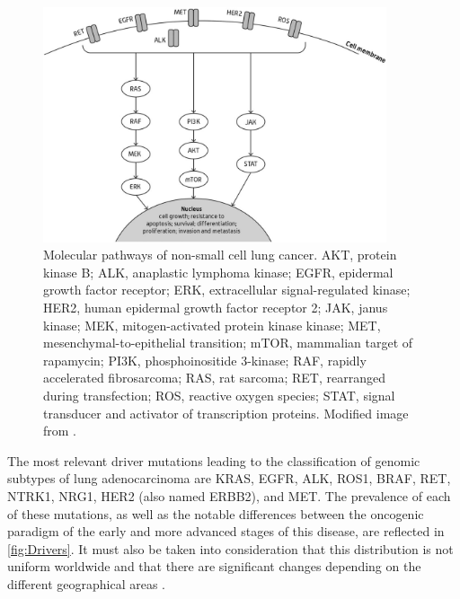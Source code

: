 \begin{figure}[t]
    \centering
    \includegraphics[width=0.9\textwidth]{Images/chapter_1/molecular_pathway.png}
    \caption{Molecular pathways of non-small cell lung cancer. AKT, protein kinase B; ALK, anaplastic lymphoma kinase; EGFR, epidermal growth factor receptor; ERK, extracellular signal-regulated kinase; HER2, human epidermal growth factor receptor 2; JAK, janus kinase; MEK, mitogen-activated protein kinase kinase; MET, mesenchymal-to-epithelial transition; mTOR, mammalian target of rapamycin; PI3K, phosphoinositide 3-kinase; RAF, rapidly accelerated fibrosarcoma; RAS, rat sarcoma; RET, rearranged during transfection; ROS, reactive oxygen species; STAT, signal transducer and activator of transcription proteins. Modified image from \cite{NSCLC_drivers}.}
    \label{fig:Pathway}
\end{figure}

The most relevant driver mutations leading to the classification of genomic subtypes of lung adenocarcinoma are KRAS, EGFR, ALK, ROS1, BRAF, RET, NTRK1, NRG1, HER2 (also named ERBB2), and MET. The prevalence of each of these mutations, as well as the notable differences between the oncogenic paradigm of the early and more advanced stages of this disease, are reflected in \autoref{fig:Drivers}. It must also be taken into consideration that this distribution is not uniform worldwide and that there are significant changes depending on the different geographical areas \cite{Mol_bio}.

